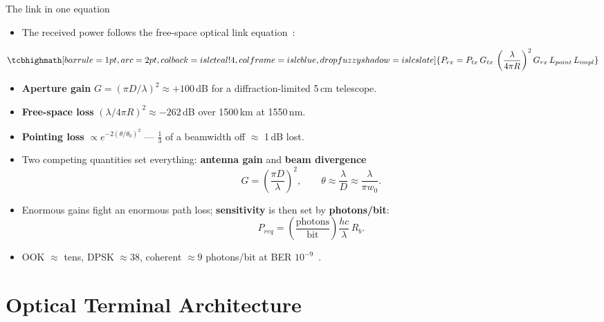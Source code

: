 \documentclass{KAIST-slide}
\newcommand{\ai}{\item[\textcolor{islcteal}{\ding{228}}]}      %
\newcommand{\si}{\item[\textcolor{islcorange}{\ding{167}}]}    %
\newcommand{\hi}[1]{\textcolor{islcorange}{\textbf{#1}}}       %
\newcommand{\key}[1]{\textcolor{islcblue}{\textbf{#1}}}        %
\begin{document}
\begin{frame}[allowframebreaks=1.2]{The link in one equation}
    \begin{itemize}
        \ai The received power follows the free-space optical link equation~\cite{hemmati2009near,caplan2007laser}:
    \end{itemize}
    \begin{equation*}
        \tcbhighmath[boxrule=1pt,arc=2pt,colback=islcteal!4,colframe=islcblue,drop fuzzy shadow=islcslate]{%
        P_{rx} = P_{tx}\, G_{tx}\, \left(\frac{\lambda}{4\pi R}\right)^{2} G_{rx}\, L_{point}\, L_{impl}}
    \end{equation*}
    \begin{itemize}
        \si \hi{Aperture gain} $G = (\pi D/\lambda)^2 \approx +100$\,dB for a diffraction-limited 5\,cm telescope.
        \si \hi{Free-space loss} $(\lambda/4\pi R)^2 \approx -262$\,dB over 1500\,km at 1550\,nm.
        \si \hi{Pointing loss} $\propto e^{-2(\theta/\theta_0)^2}$ --- $\tfrac13$ of a beamwidth off $\approx$ 1\,dB lost.
    \end{itemize}
    \framebreak
    \begin{itemize}
        \ai Two competing quantities set everything: \key{antenna gain} and \key{beam divergence}
        \begin{equation*}
            G = \left(\frac{\pi D}{\lambda}\right)^{2}, \qquad \theta \approx \frac{\lambda}{D}\approx\frac{\lambda}{\pi w_0}.
        \end{equation*}
        \ai Enormous gains fight an enormous path loss; \key{sensitivity} is then set by \hi{photons/bit}:
        \begin{equation*}
            P_{req} = \left(\frac{\text{photons}}{\text{bit}}\right)\frac{hc}{\lambda}\,R_b .
        \end{equation*}
        \si OOK $\approx$ tens, DPSK $\approx 38$, coherent $\approx 9$ photons/bit at BER $10^{-9}$~\cite{caplan2007laser}.
    \end{itemize}
\end{frame}

\section{Optical Terminal Architecture}
\end{document}

